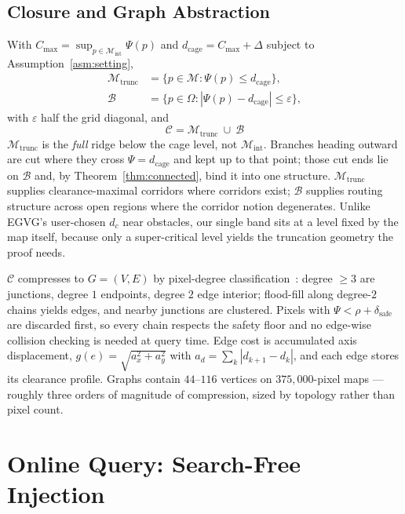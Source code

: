 \documentclass[conference]{IEEEtran}
\begin{document}
\subsection{Closure and Graph Abstraction}
\label{sec:closure}

With $C_{\max}=\sup_{p\in\mathcal{M}_{\mathrm{int}}}\Psi(p)$ and $d_{\mathrm{cage}}=C_{\max}+\Delta$ subject to Assumption~\ref{asm:setting},
\begin{align}
\mathcal{M}_{\mathrm{trunc}} &= \{p\in\mathcal{M}: \Psi(p)\le d_{\mathrm{cage}}\}, \label{eq:trunc}\\
\mathcal{B} &= \{p\in\Omega: |\Psi(p)-d_{\mathrm{cage}}|\le\varepsilon\},
\end{align}
with $\varepsilon$ half the grid diagonal, and
\begin{equation}
{\ \mathcal{C}=\mathcal{M}_{\mathrm{trunc}}\ \cup\ \mathcal{B}\ }
\label{eq:cage}
\end{equation}
$\mathcal{M}_{\mathrm{trunc}}$ is the \emph{full} ridge below the cage level, not $\mathcal{M}_{\mathrm{int}}$. Branches heading outward are cut where they cross $\Psi=d_{\mathrm{cage}}$ and kept up to that point; those cut ends lie on $\mathcal{B}$ and, by Theorem~\ref{thm:connected}, bind it into one structure. $\mathcal{M}_{\mathrm{trunc}}$ supplies clearance-maximal corridors where corridors exist; $\mathcal{B}$ supplies routing structure across open regions where the corridor notion degenerates. Unlike EGVG's user-chosen $d_c$ near obstacles, our single band sits at a level fixed by the map itself, because only a super-critical level yields the truncation geometry the proof needs.

$\mathcal{C}$ compresses to $G=(V,E)$ by pixel-degree classification~\cite{qi2025egvg,lau2013}: degree $\ge 3$ are junctions, degree $1$ endpoints, degree $2$ edge interior; flood-fill along degree-$2$ chains yields edges, and nearby junctions are clustered. Pixels with $\Psi<\rho+\delta_{\mathrm{safe}}$ are discarded first, so every chain respects the safety floor and no edge-wise collision checking is needed at query time. Edge cost is accumulated axis displacement, $g(e)=\sqrt{a_x^2+a_y^2}$ with $a_d=\sum_k|d_{k+1}-d_k|$, and each edge stores its clearance profile. Graphs contain $44$--$116$ vertices on $375{,}000$-pixel maps --- roughly three orders of magnitude of compression, sized by topology rather than pixel count.

\section{Online Query: Search-Free Injection}
\label{sec:online}
\end{document}
